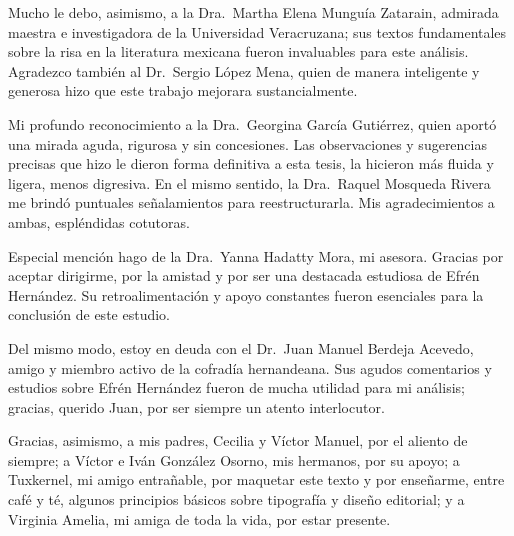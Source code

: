 \documentclass[14pt,twoside,final]{extbook} %
\begin{document}
Mucho le debo, asimismo, a la Dra.~Martha Elena Munguía Zatarain, admirada maestra e investigadora de la Universidad Veracruzana; sus textos fundamentales sobre la risa en la literatura mexicana fueron invaluables para este análisis. Agradezco también al Dr.~Sergio López Mena, quien de manera inteligente y generosa hizo que este trabajo mejorara sustancialmente.

Mi profundo reconocimiento a la Dra.~Georgina García Gutiérrez, quien aportó una mirada aguda, rigurosa y sin concesiones. Las observaciones y sugerencias precisas que hizo le dieron forma definitiva a esta tesis, la hicieron más fluida y ligera, menos digresiva. En el mismo sentido, la Dra.~Raquel Mosqueda Rivera me brindó puntuales señalamientos para reestructurarla. Mis agradecimientos a ambas, espléndidas cotutoras.

Especial mención hago de la Dra.~Yanna Hadatty Mora, mi asesora. Gracias por aceptar dirigirme, por la amistad y por ser una destacada estudiosa de Efrén Hernández. Su retroalimentación y apoyo constantes fueron esenciales para la conclusión de este estudio.

Del mismo modo, estoy en deuda con el Dr.~Juan Manuel Berdeja Acevedo, amigo y miembro activo de la cofradía hernandeana. Sus agudos comentarios y estudios sobre Efrén Hernández fueron de mucha utilidad para mi análisis; gracias, querido Juan, por ser siempre un atento interlocutor.

Gracias, asimismo, a mis padres, Cecilia y Víctor Manuel, por el aliento de siempre; a Víctor e Iván González Osorno, mis hermanos, por su apoyo; a Tuxkernel, mi amigo entrañable, por maquetar este texto y por enseñarme, entre café y té, algunos principios básicos sobre tipografía y diseño editorial; y a Virginia Amelia, mi amiga de toda la vida, por estar presente.
\end{document}
